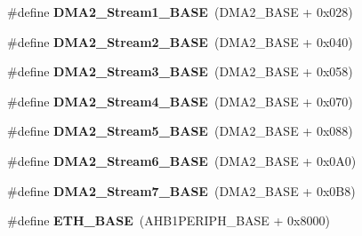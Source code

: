 \begin{DoxyCompactItemize}
\item 
\#define {\bfseries D\+M\+A2\+\_\+\+Stream1\+\_\+\+B\+A\+SE}~(D\+M\+A2\+\_\+\+B\+A\+SE + 0x028)\hypertarget{group___peripheral__memory__map_ga35512bdc3f5e9df4557c2fbe7935d0b1}{}\label{group___peripheral__memory__map_ga35512bdc3f5e9df4557c2fbe7935d0b1}

\item 
\#define {\bfseries D\+M\+A2\+\_\+\+Stream2\+\_\+\+B\+A\+SE}~(D\+M\+A2\+\_\+\+B\+A\+SE + 0x040)\hypertarget{group___peripheral__memory__map_gaed33a06f08188466f2ede06160984e9a}{}\label{group___peripheral__memory__map_gaed33a06f08188466f2ede06160984e9a}

\item 
\#define {\bfseries D\+M\+A2\+\_\+\+Stream3\+\_\+\+B\+A\+SE}~(D\+M\+A2\+\_\+\+B\+A\+SE + 0x058)\hypertarget{group___peripheral__memory__map_gaf3a9480e08c6ae94f4482e0cdaebdd17}{}\label{group___peripheral__memory__map_gaf3a9480e08c6ae94f4482e0cdaebdd17}

\item 
\#define {\bfseries D\+M\+A2\+\_\+\+Stream4\+\_\+\+B\+A\+SE}~(D\+M\+A2\+\_\+\+B\+A\+SE + 0x070)\hypertarget{group___peripheral__memory__map_gad1e67740e6301233473f64638145dd1f}{}\label{group___peripheral__memory__map_gad1e67740e6301233473f64638145dd1f}

\item 
\#define {\bfseries D\+M\+A2\+\_\+\+Stream5\+\_\+\+B\+A\+SE}~(D\+M\+A2\+\_\+\+B\+A\+SE + 0x088)\hypertarget{group___peripheral__memory__map_gaed1460fdc407b6decfbffccb0260d0af}{}\label{group___peripheral__memory__map_gaed1460fdc407b6decfbffccb0260d0af}

\item 
\#define {\bfseries D\+M\+A2\+\_\+\+Stream6\+\_\+\+B\+A\+SE}~(D\+M\+A2\+\_\+\+B\+A\+SE + 0x0\+A0)\hypertarget{group___peripheral__memory__map_ga5e81174c96fd204fa7c82c815e85c8e6}{}\label{group___peripheral__memory__map_ga5e81174c96fd204fa7c82c815e85c8e6}

\item 
\#define {\bfseries D\+M\+A2\+\_\+\+Stream7\+\_\+\+B\+A\+SE}~(D\+M\+A2\+\_\+\+B\+A\+SE + 0x0\+B8)\hypertarget{group___peripheral__memory__map_gaa9faa708ad2440d24eb1064cba9bb06d}{}\label{group___peripheral__memory__map_gaa9faa708ad2440d24eb1064cba9bb06d}

\item 
\#define {\bfseries E\+T\+H\+\_\+\+B\+A\+SE}~(A\+H\+B1\+P\+E\+R\+I\+P\+H\+\_\+\+B\+A\+SE + 0x8000)\hypertarget{group___peripheral__memory__map_gad965a7b1106ece575ed3da10c45c65cc}{}\label{group___peripheral__memory__map_gad965a7b1106ece575ed3da10c45c65cc}


\end{DoxyCompactItemize}
